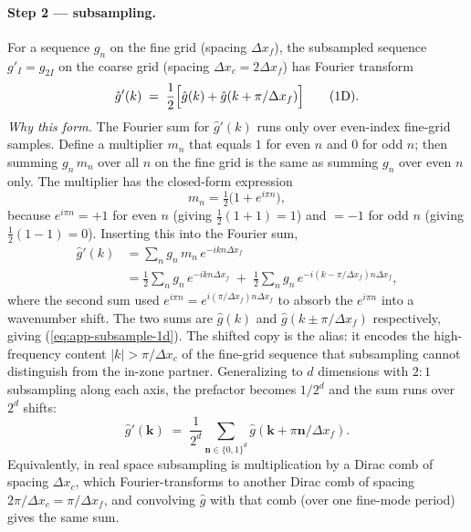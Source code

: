 \documentclass[12pt]{article}
\begin{document}
\paragraph{Step 2 --- subsampling.}
For a sequence $g_n$ on the fine grid (spacing $\Delta x_f$), the
subsampled sequence $g'_I=g_{2I}$ on the coarse grid (spacing
$\Delta x_c=2\Delta x_f$) has Fourier transform
\begin{equation}\label{eq:app-subsample-1d}
  \hat g'(k) \;=\; \frac{1}{2}\Bigl[\hat g(k) + \hat g(k + \pi/\Delta x_f)\Bigr]
  \qquad \text{(1D)}.
\end{equation}
\emph{Why this form.} The Fourier sum for $\hat g'(k)$ runs only
over even-index fine-grid samples. Define a multiplier $m_n$ that
equals $1$ for even $n$ and $0$ for odd $n$; then summing
$g_n\,m_n$ over all $n$ on the fine grid is the same as summing
$g_n$ over even $n$ only. The multiplier has the closed-form
expression
\begin{equation*}
  m_n = \tfrac12\bigl(1+e^{i\pi n}\bigr),
\end{equation*}
because $e^{i\pi n}=+1$ for even $n$ (giving $\tfrac12(1+1)=1$) and
$=-1$ for odd $n$ (giving $\tfrac12(1-1)=0$). Inserting this into
the Fourier sum,
\begin{align*}
  \hat g'(k)
  &= \sum_n g_n\,m_n\,e^{-ikn\Delta x_f} \\
  &= \tfrac12\sum_n g_n\,e^{-ikn\Delta x_f}
    \;+\;\tfrac12\sum_n g_n\,e^{-i(k-\pi/\Delta x_f)n\Delta x_f},
\end{align*}
where the second sum used $e^{i\pi n}=e^{i(\pi/\Delta x_f)n\Delta x_f}$ to
absorb the $e^{i\pi n}$ into a wavenumber shift. The two sums are
$\hat g(k)$ and $\hat g(k\pm\pi/\Delta x_f)$ respectively, giving
(\ref{eq:app-subsample-1d}). The shifted copy is the alias: it
encodes the high-frequency content $|k|>\pi/\Delta x_c$ of the
fine-grid sequence that subsampling cannot distinguish from the
in-zone partner.
Generalizing to $d$ dimensions with $2{:}1$ subsampling along each
axis, the prefactor becomes $1/2^d$ and the sum runs over $2^d$
shifts:
\begin{equation}\label{eq:app-subsample}
  \hat g'(\mathbf k) \;=\; \frac{1}{2^d}
  \sum_{\mathbf n\in\{0,1\}^d}
  \hat g\!\left(\mathbf k + \pi\mathbf n/\Delta x_f\right).
\end{equation}
Equivalently, in real space subsampling is multiplication by a Dirac
comb of spacing $\Delta x_c$, which Fourier-transforms to another
Dirac comb of spacing $2\pi/\Delta x_c=\pi/\Delta x_f$, and convolving
$\hat g$ with that comb (over one fine-mode period) gives the same
sum.
\end{document}
